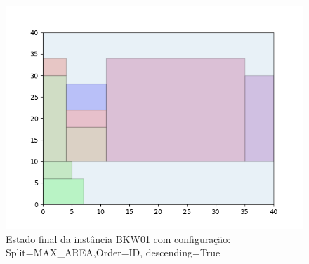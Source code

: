\begin{figure}[H]
    \centering
    \caption[]{Estado final da instância BKW01 com configuração: Split=MAX_AREA,Order=ID, descending=True}
    \label{fig:bkw01-max_area-id-true}
    \includegraphics[scale=0.5]{output/figures/bkw/bkw01/max_area/id/true/00}
\end{figure}